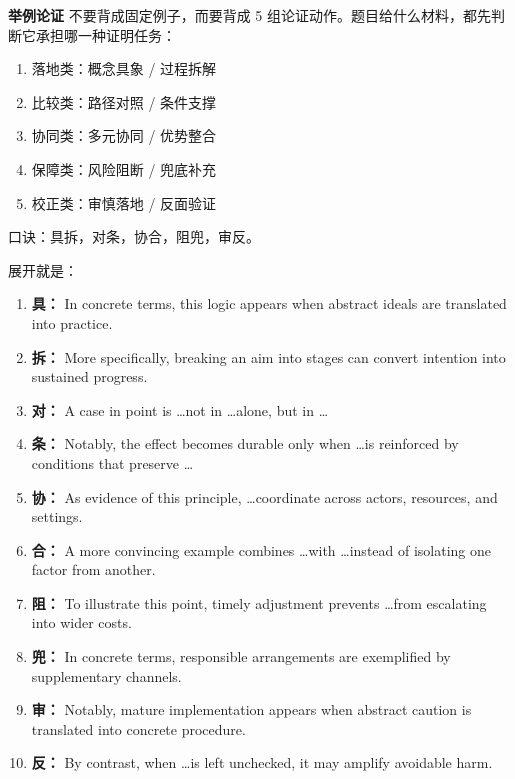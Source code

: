 ﻿\documentclass[lang=cn,11pt]{elegantbook}
\begin{document}
\begin{note}
\textbf{举例论证} 不要背成固定例子，而要背成 5 组论证动作。题目给什么材料，都先判断它承担哪一种证明任务：
\begin{enumerate}
  \item 落地类：概念具象 / 过程拆解
  \item 比较类：路径对照 / 条件支撑
  \item 协同类：多元协同 / 优势整合
  \item 保障类：风险阻断 / 兜底补充
  \item 校正类：审慎落地 / 反面验证
\end{enumerate}
口诀：具拆，对条，协合，阻兜，审反。

展开就是：

\begin{enumerate}
  \item \textbf{具：} In concrete terms, this logic appears when abstract ideals are translated into practice.
  \item \textbf{拆：} More specifically, breaking an aim into stages can convert intention into sustained progress.

  \item \textbf{对：} A case in point is \ldots not in \ldots alone, but in \ldots
  \item \textbf{条：} Notably, the effect becomes durable only when \ldots is reinforced by conditions that preserve \ldots

  \item \textbf{协：} As evidence of this principle, \ldots coordinate across actors, resources, and settings.
  \item \textbf{合：} A more convincing example combines \ldots with \ldots instead of isolating one factor from another.

  \item \textbf{阻：} To illustrate this point, timely adjustment prevents \ldots from escalating into wider costs.
  \item \textbf{兜：} In concrete terms, responsible arrangements are exemplified by supplementary channels.

  \item \textbf{审：} Notably, mature implementation appears when abstract caution is translated into concrete procedure.
  \item \textbf{反：} By contrast, when \ldots is left unchecked, it may amplify avoidable harm.
\end{enumerate}


\end{note}
\end{document}
